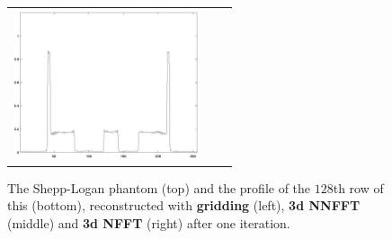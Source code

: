 \documentclass[journal]{IEEEtran}
\numberwithin{equation}{section}
\numberwithin{table}{section}
\numberwithin{figure}{section}
\begin{document}
\begin{figure}[ht!]
\begin{tabular}{ccc}
\includegraphics[width=5.5cm]{pics/phantom_3d_iter=1row.jpg} 
\end{tabular}
\caption{The Shepp-Logan phantom (top) and the profile of the $128$th row of this (bottom), reconstructed
with {\bf gridding} (left), {\bf 3d NNFFT} (middle) and {\bf 3d NFFT} (right) after one iteration.} \label{Fig:1}
\end{figure}
\end{document}
